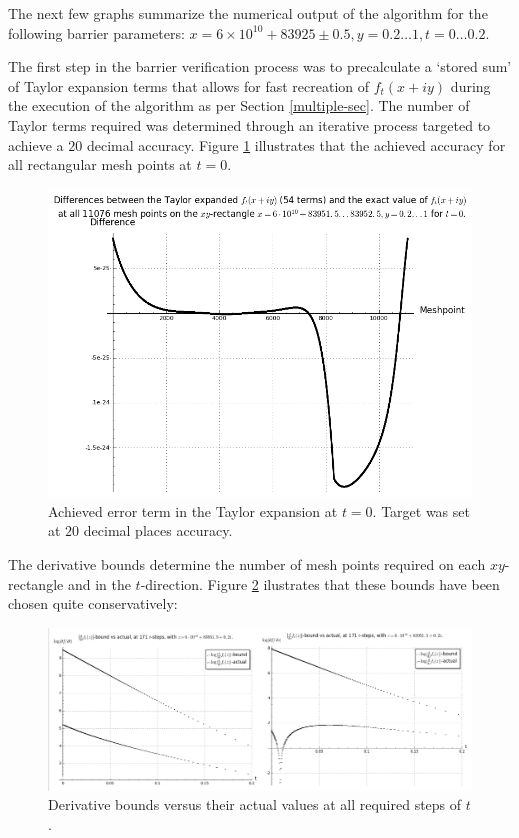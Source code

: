 The next few graphs summarize the numerical output of the algorithm for the following barrier parameters: $x=6\times 10^{10}+83925 \pm 0.5, y = 0.2 \dots 1, t=0 \dots 0.2$.  

The first step in the barrier verification process was to precalculate a `stored sum' of Taylor expansion terms that allows for fast recreation of $f_t(x+iy)$ during the execution of the algorithm as per Section \ref{multiple-sec}. The number of Taylor terms required was determined through an iterative process targeted to achieve a $20$ decimal accuracy.  Figure \ref{fig1} illustrates that the achieved accuracy for all rectangular mesh points at $t=0$.

\begin{figure}[h!]
  \includegraphics[width=0.7\linewidth]{BarrieraccuracyTaylor}
  \caption{Achieved error term in the Taylor expansion at $t=0$. Target was set at $20$ decimal places accuracy.}\label{fig1}
\end{figure}

The derivative bounds determine the number of mesh points required on each $xy$-rectangle and in the $t$-direction. Figure \ref{fig2} ilustrates that these bounds have been chosen quite conservatively:

\begin{figure}[h!]
  \includegraphics[width=1.0\linewidth]{Derivativebounds}
  \caption{Derivative bounds versus their actual values at all required steps of $t$.}\label{fig2}
\end{figure}

